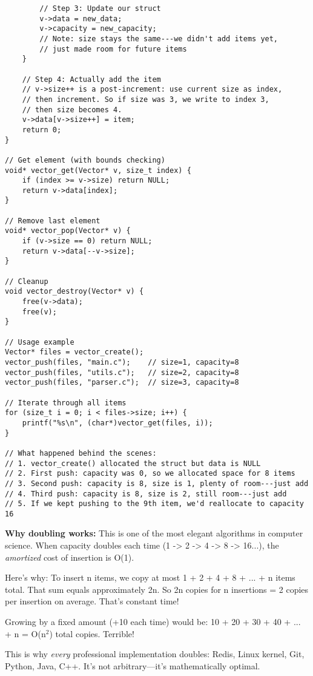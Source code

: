 \begin{lstlisting}
        // Step 3: Update our struct
        v->data = new_data;
        v->capacity = new_capacity;
        // Note: size stays the same---we didn't add items yet,
        // just made room for future items
    }

    // Step 4: Actually add the item
    // v->size++ is a post-increment: use current size as index,
    // then increment. So if size was 3, we write to index 3,
    // then size becomes 4.
    v->data[v->size++] = item;
    return 0;
}

// Get element (with bounds checking)
void* vector_get(Vector* v, size_t index) {
    if (index >= v->size) return NULL;
    return v->data[index];
}

// Remove last element
void* vector_pop(Vector* v) {
    if (v->size == 0) return NULL;
    return v->data[--v->size];
}

// Cleanup
void vector_destroy(Vector* v) {
    free(v->data);
    free(v);
}

// Usage example
Vector* files = vector_create();
vector_push(files, "main.c");    // size=1, capacity=8
vector_push(files, "utils.c");   // size=2, capacity=8
vector_push(files, "parser.c");  // size=3, capacity=8

// Iterate through all items
for (size_t i = 0; i < files->size; i++) {
    printf("%s\n", (char*)vector_get(files, i));
}

// What happened behind the scenes:
// 1. vector_create() allocated the struct but data is NULL
// 2. First push: capacity was 0, so we allocated space for 8 items
// 3. Second push: capacity is 8, size is 1, plenty of room---just add
// 4. Third push: capacity is 8, size is 2, still room---just add
// 5. If we kept pushing to the 9th item, we'd reallocate to capacity 16
\end{lstlisting}

\begin{tipbox}
\textbf{Why doubling works:} This is one of the most elegant algorithms in computer science. When capacity doubles each time (1 -> 2 -> 4 -> 8 -> 16...), the \textit{amortized} cost of insertion is O(1).

Here's why: To insert n items, we copy at most 1 + 2 + 4 + 8 + ... + n items total. That sum equals approximately 2n. So 2n copies for n insertions = 2 copies per insertion on average. That's constant time!

Growing by a fixed amount (+10 each time) would be: 10 + 20 + 30 + 40 + ... + n = O(n$^2$) total copies. Terrible!

This is why \textit{every} professional implementation doubles: Redis, Linux kernel, Git, Python, Java, C++. It's not arbitrary---it's mathematically optimal.
\end{tipbox}

